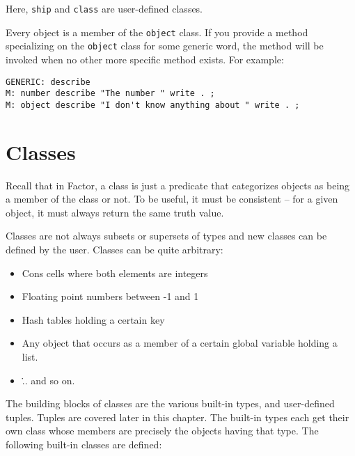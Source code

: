 \documentclass[english]{book}
\begin{document}
Here, \texttt{ship} and \texttt{class} are user-defined classes.

Every object is a member of the \texttt{object} class. If you provide a method specializing
on the \texttt{object} class for some generic word, the method will be
invoked when no other more specific method exists. For example:

\begin{verbatim}
GENERIC: describe
M: number describe "The number " write . ;
M: object describe "I don't know anything about " write . ;
\end{verbatim}

\section{Classes}

Recall that in Factor, a class is just a predicate that categorizes objects as
being a member of the class or not. To be useful, it must be consistent
-- for a given object, it must always return the same truth value.

Classes are not always subsets or supersets of types and new classes can be defined by the user. Classes can be quite arbitrary:

\begin{itemize}
\item Cons cells where both elements are integers

\item Floating point numbers between -1 and 1

\item Hash tables holding a certain key

\item Any object that occurs as a member of a certain global variable
holding a list.

\item \... and so on.
\end{itemize}

The building blocks of classes are the various built-in types, and
user-defined tuples. Tuples are covered later in this chapter.
The built-in types each get their own class whose members are precisely
the objects having that type. The following built-in classes are
defined:
\end{document}
